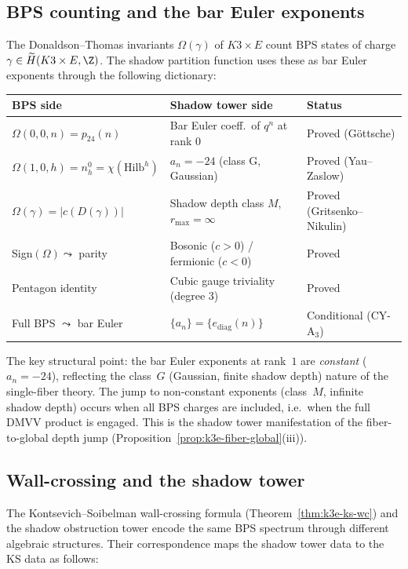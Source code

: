 \subsection{BPS counting and the bar Euler exponents}
\label{subsec:k3e-bps-exponents}

The Donaldson--Thomas invariants $\Omega(\gamma)$ of $K3 \times E$ count BPS states of charge $\gamma \in \widetilde{H}(K3 \times E, \Z)$. The shadow partition function uses these as bar Euler exponents through the following dictionary:

\begin{center}
\renewcommand{\arraystretch}{1.3}
\begin{tabular}{@{}lll@{}}
\textbf{BPS side} & \textbf{Shadow tower side} & \textbf{Status} \\ \hline
$\Omega(0,0,n) = p_{24}(n)$ & Bar Euler coeff.\ of $q^n$ at rank $0$ & Proved (G\"ottsche) \\
$\Omega(1,0,h) = n_h^0 = \chi(\mathrm{Hilb}^h)$ & $a_n = -24$ (class G, Gaussian) & Proved (Yau--Zaslow) \\
$\Omega(\gamma) = |c(D(\gamma))|$ & Shadow depth class $M$, $r_{\max} = \infty$ & Proved (Gritsenko--Nikulin) \\
Sign$(\Omega) \leadsto$ parity & Bosonic ($c > 0$) / fermionic ($c < 0$) & Proved \\
Pentagon identity & Cubic gauge triviality (degree $3$) & Proved \\
Full BPS $\leadsto$ bar Euler & $\{a_n\} = \{e_{\mathrm{diag}}(n)\}$ & Conditional (CY-A$_3$)
\end{tabular}
\end{center}

\noindent The key structural point: the bar Euler exponents at rank~$1$ are \emph{constant} ($a_n = -24$), reflecting the class~$G$ (Gaussian, finite shadow depth) nature of the single-fiber theory. The jump to non-constant exponents (class~$M$, infinite shadow depth) occurs when all BPS charges are included, i.e.\ when the full DMVV product is engaged. This is the shadow tower manifestation of the fiber-to-global depth jump (Proposition~\ref{prop:k3e-fiber-global}(iii)).

\subsection{Wall-crossing and the shadow tower}
\label{subsec:k3e-wc-shadow}

The Kontsevich--Soibelman wall-crossing formula (Theorem~\ref{thm:k3e-ks-wc}) and the shadow obstruction tower encode the same BPS spectrum through different algebraic structures. Their correspondence maps the shadow tower data to the KS data as follows:

